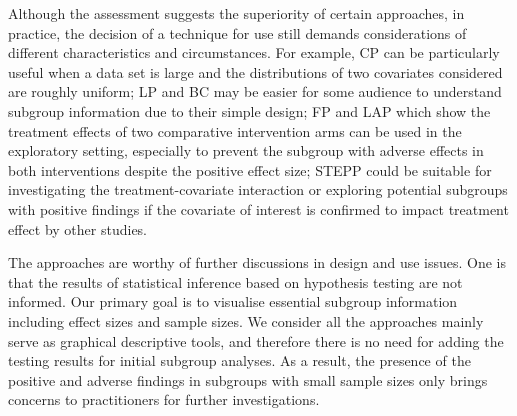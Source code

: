 \documentclass[Afour,sagev,times, doublespace]{sagej}
\begin{document}
{%

Although the assessment suggests the superiority of certain approaches, in practice, the decision of a technique for use still demands considerations of different characteristics and circumstances. For example, CP can be particularly useful when a data set is large and the distributions of two covariates considered are roughly uniform; LP and BC may be easier for some audience to understand subgroup information due to their simple design; FP and LAP which show the treatment effects of two comparative intervention arms can be used in the exploratory setting, especially to prevent the subgroup with adverse effects in both interventions despite the positive effect size; STEPP could be suitable for investigating the treatment-covariate interaction or exploring potential subgroups with positive findings if the covariate of interest is confirmed to impact treatment effect by other studies.


The approaches are worthy of further discussions in design and use issues. One is that the results of statistical inference based on hypothesis testing are not informed. Our primary goal is to visualise essential subgroup information including effect sizes and sample sizes. We consider all the approaches mainly serve as graphical descriptive tools, and therefore there is no need for adding the testing results for initial subgroup analyses. As a result, the presence of the positive and adverse findings in subgroups with small sample sizes only brings concerns to practitioners for further investigations. %

}
\end{document}
